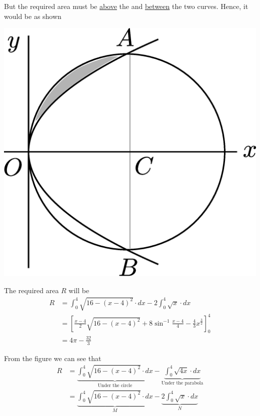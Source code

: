 \documentclass[14pt,fleqn]{extarticle}
\newcommand\expa{16- \left(x-4 \right)^2}
\newcommand\intga{\int_0^4 \sqrt{\expa}\cdot dx}
\newcommand\intgb{2\int_0^4 \sqrt{x}\cdot dx}
\begin{document}
\begin{question}
\begin{step}
But the required area must be \underline{above} the \xaxis and \underline{between} the two curves. Hence, it would be as shown 

\begin{center}
\includegraphics[scale=0.2]{1381-C.eps}
\end{center}
       
\end{step}

\begin{step}
  \begin{options} 
     \correct 
       
     The required area $R$ will be 
     \smallmath
     \begin{align}
	R &= \intga - \intgb \\
	&= \left[\frac{x-4}{2}\sqrt{\expa} + 8\sin^{-1}\frac{x-4}{4} - \frac{4}{3}x^{\frac{3}{2}}\right]_0^4 \\
	&= 4\pi - \frac{32}{3}
\end{align}

  
    \end{options} 
     \reason 
     
     From the figure we can see that 
     \smallmath\begin{align}
     R &= \underbrace{\intga}_{\text{Under the circle}} - \underbrace{\int_0^4 \sqrt{4x}\cdot dx}_{\text{Under the parabola}} \\
     &= \underbrace{\intga}_M - \underbrace{\intgb}_N
\end{align}


\end{step}
\end{question}
\end{document}
